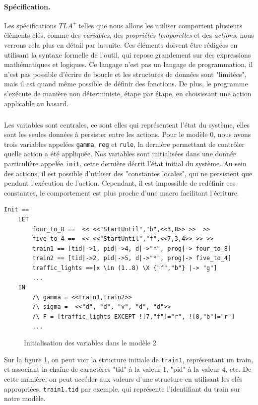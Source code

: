 \documentclass[oneside, a4paper, 11pt]{book}
\newcommand{\TLA}{\ensuremath{TLA^+~}}
\begin{document}
\paragraph{Spécification.} Les spécifications \TLA telles que nous allons les utiliser comportent plusieurs éléments clés, comme des \emph{variables}, des \emph{propriétés temporelles} et des \emph{actions}, nous verrons cela plus en détail par la suite.
Ces éléments doivent être rédigées en utilisant la syntaxe formelle de l'outil, qui repose grandement sur des expressions mathématiques et logiques. Ce langage n'est pas un langage de programmation, il n'est pas possible d'écrire de boucle et les structures de données sont "limitées", mais il est quand même possible de définir des fonctions. 
De plus, le programme s'exécute de manière non déterministe, étape par étape, en choisissant une action applicable au hasard.

\subparagraph{} Les variables sont centrales, ce sont elles qui représentent l'état du système, elles sont les seules données à persister entre les actions. Pour le modèle 0, nous avons trois variables appelées \texttt{gamma}, \texttt{reg} et \texttt{rule}, la dernière permettant de contrôler quelle action a été appliquée.
Nos variables sont initialisées dans une donnée particulière appelée \texttt{init}, cette dernière décrit l'état initial du système.
Au sein des actions, il est possible d'utiliser des "constantes locales", qui ne persistent que pendant l'exécution de l'action. Cependant, il est impossible de redéfinir ces constantes, le comportement est plus proche d'une macro facilitant l'écriture.

\newpage
\begin{verbatim}
Init == 
	LET 
		four_to_8 ==  << <<"StartUntil","b",<<3,8>> >>  >>
		five_to_4 ==  << <<"StartUntil","f",<<7,3,4>> >> >>
		train1 == [tid|->1, pid|->4, d|->"*", prog|-> four_to_8]
		train2 == [tid|->2, pid|->5, d|->"*", prog|-> five_to_4]
		traffic_lights ==[x \in (1..8) \X {"f","b"} |-> "g"]
		...
	IN
		/\ gamma = <<train1,train2>>
		/\ sigma =  <<"d", "d", "v", "d", "d">> 
		/\ F = [traffic_lights EXCEPT ![7,"f"]="r", ![8,"b"]="r"]
		...
\end{verbatim}

\begin{figure}[h]
	\caption{Initialisation des variables dans le modèle 2}
	\label{fig:initTLA}
\end{figure}

Sur la figure \ref{fig:initTLA}, on peut voir la structure initiale de \texttt{train1}, représentant un train, et associant la chaîne de caractères "tid" à la valeur 1, "pid" à la valeur 4, etc. De cette manière, on peut accéder aux valeurs d'une structure en utilisant les clés appropriées, \texttt{train1.tid} par exemple, qui représente l'identifiant du train sur notre modèle.
\end{document}
